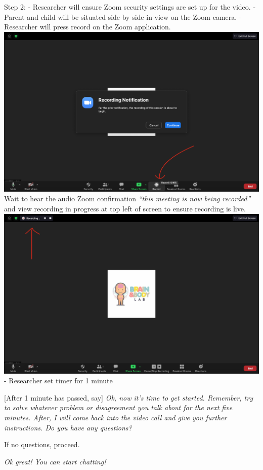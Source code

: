 \documentclass[]{book}
\begin{document}
Step 2:
- Researcher will ensure Zoom security settings are set up for the video.
- Parent and child will be situated side-by-side in view on the Zoom camera.
-Researcher will press record on the Zoom application. \includegraphics{images/zoom_parent_child_interaction/3.png} Wait to hear the audio Zoom confirmation \emph{``this meeting is now being recorded''} and view recording in progress at top left of screen to ensure recording is live. \includegraphics{images/zoom_parent_child_interaction/4.png}
- Researcher set timer for 1 minute

{[}After 1 minute has passed, say{]} \emph{Ok, now it's time to get started. Remember, try to solve whatever problem or disagreement you talk about for the next five minutes. After, I will come back into the video call and give you further instructions. Do you have any questions?}

If no questions, proceed.

\emph{Ok great! You can start chatting!}
\end{document}

